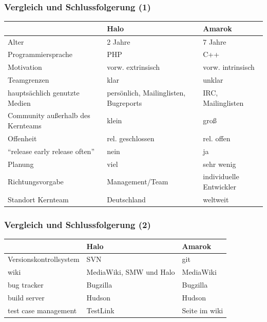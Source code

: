 \documentclass{beamer}
\begin{document}
\begin{frame}
\frametitle{Vergleich und Schlussfolgerung (1)}
\begin{tabularx}{\textwidth}{|X|X|X|}
\hline
 & Halo & Amarok \\
\hline \hline
Alter & 2 Jahre & 7 Jahre \\
\hline
Programmiersprache & PHP & C++ \\
\hline
Motivation & vorw. extrinsisch & vorw. intrinsisch \\
\hline
Teamgrenzen & klar & unklar\\
\hline
haupts\"achlich genutzte Medien & pers\"onlich, Mailinglisten, Bugreports & IRC, Mailinglisten \\
\hline
Community au\ss erhalb des Kernteams & klein & gro\ss \\
\hline
Offenheit & rel. geschlossen & rel. offen \\
\hline
``release early release often'' & nein & ja \\
\hline
Planung & viel & sehr wenig \\
\hline
Richtungsvorgabe & Management/Team & individuelle Entwickler \\
\hline
Standort Kernteam & Deutschland & weltweit \\
\hline
\end{tabularx}
\end{frame}

\begin{frame}
\frametitle{Vergleich und Schlussfolgerung (2)}
\begin{tabularx}{\textwidth}{|X|X|X|}
\hline
 & Halo & Amarok\\
\hline \hline
Versionskontrollsystem & SVN & git\\
\hline
wiki & MediaWiki, SMW und Halo & MediaWiki\\
\hline
bug tracker & Bugzilla & Bugzilla\\
\hline
build server & Hudson & Hudson\\
\hline
test case management & TestLink & Seite im wiki\\
\hline
\end{tabularx}
\end{frame}
\end{document}
